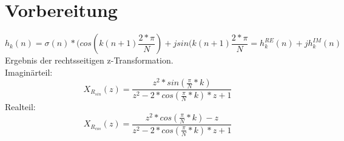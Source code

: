 \chapter{Vorbereitung}
\begin{equation}
  h_{k}(n)=\sigma(n)*(cos(k(n+1)\frac{2*\pi}{N})+jsin(k(n+1)\frac{2*\pi}{N}=h_{k}^{RE}(n)+jh_{k}^{IM}(n)
\end{equation}
Ergebnis der rechtsseitigen z-Transformation.\\
Imaginärteil:
\begin{equation}
  X_{R_{sin}}(z)= \frac{z^{2}*sin(\frac{\pi}{N}*k)}{z^{2}-2*cos(\frac{\pi}{N}*k)*z+1}
\end{equation}
Realteil:
\begin{equation}
  X_{R_{cos}}(z)=\frac{z^{2}*cos(\frac{\pi}{N}*k)-z}{z^{2}-2*cos(\frac{\pi}{N}*k)*z+1}
\end{equation}
